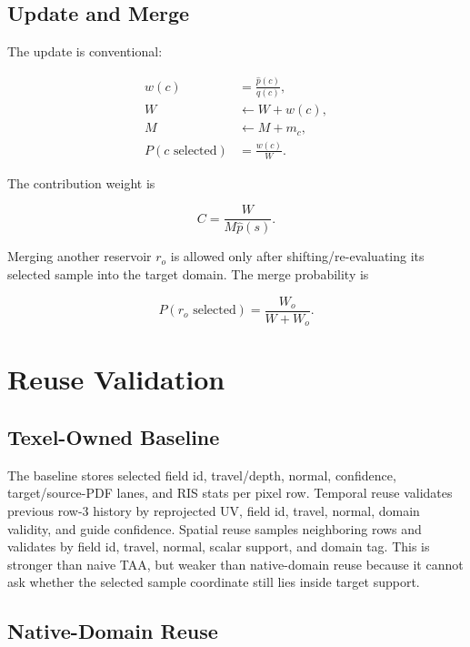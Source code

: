 \documentclass[11pt]{article}
\newcommand{\Target}{\hat{p}}
\newcommand{\Pdf}{q}
\newcommand{\WeightSum}{W}
\begin{document}
\subsection{Update and Merge}

The update is conventional:

\begin{align}
  w(c) &= \frac{\Target(c)}{\Pdf(c)},\\
  \WeightSum &\leftarrow \WeightSum + w(c),\\
  M &\leftarrow M + m_c,\\
  P(c\text{ selected}) &= \frac{w(c)}{\WeightSum}.
\end{align}

The contribution weight is

\begin{equation}
  C = \frac{\WeightSum}{M\Target(s)}.
\end{equation}

Merging another reservoir \(r_o\) is allowed only after shifting/re-evaluating
its selected sample into the target domain.  The merge probability is

\begin{equation}
  P(r_o\text{ selected}) =
  \frac{\WeightSum_o}{\WeightSum+\WeightSum_o}.
\end{equation}

\section{Reuse Validation}

\subsection{Texel-Owned Baseline}

The baseline stores selected field id, travel/depth, normal, confidence,
target/source-PDF lanes, and RIS stats per pixel row.  Temporal reuse validates
previous row-3 history by reprojected UV, field id, travel, normal, domain
validity, and guide confidence.  Spatial reuse samples neighboring rows and
validates by field id, travel, normal, scalar support, and domain tag.  This is
stronger than naive TAA, but weaker than native-domain reuse because it cannot
ask whether the selected sample coordinate still lies inside target support.

\subsection{Native-Domain Reuse}
\end{document}
